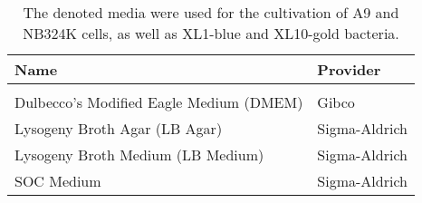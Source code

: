 \begin{center}
\begin{table}[H]
\begin{tabular}{l l}
\textbf{Name} & \textbf{Provider}\\
\hline
\\
Dulbecco's Modified Eagle Medium (DMEM) & Gibco\\
Lysogeny Broth Agar (LB Agar) & Sigma-Aldrich\\
Lysogeny Broth Medium (LB Medium) & Sigma-Aldrich\\
SOC Medium & Sigma-Aldrich\\
\end{tabular}
\caption[Media]{The denoted media were used for the cultivation of A9 and NB324K cells, as well as XL1-blue and XL10-gold bacteria.}
\label{Media}
\end{table}
\end{center}